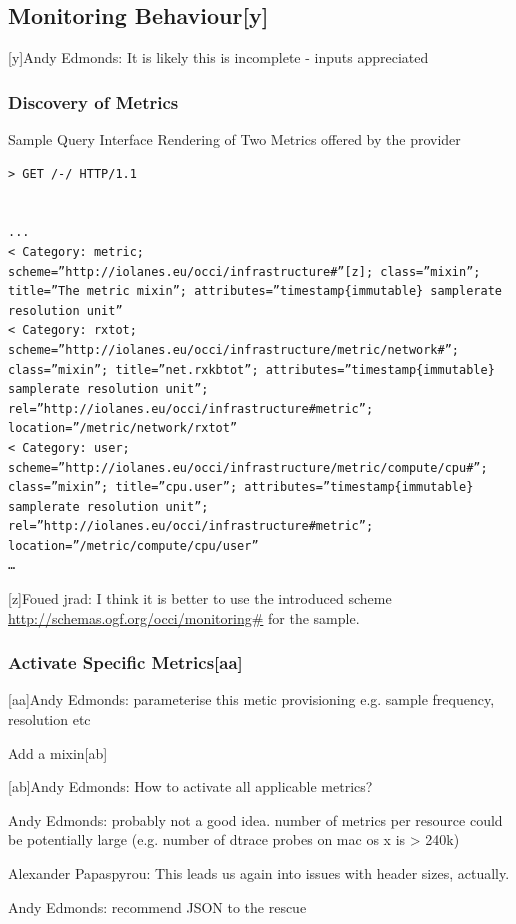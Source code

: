 \documentclass[12pt]{article}  %
\begin{document}
\subsection{Monitoring Behaviour[y]}

{
\color{blue}
[y]Andy Edmonds:
It is likely this is incomplete - inputs appreciated
}

\subsubsection{Discovery of Metrics}

Sample Query Interface Rendering of Two Metrics offered by the provider

\begin{verbatim}
> GET /-/ HTTP/1.1        


...
< Category: metric; scheme=”http://iolanes.eu/occi/infrastructure#”[z]; class=”mixin”; title=”The metric mixin”; attributes=”timestamp{immutable} samplerate resolution unit”
< Category: rxtot; scheme=”http://iolanes.eu/occi/infrastructure/metric/network#”; class=”mixin”; title=”net.rxkbtot”; attributes=”timestamp{immutable} samplerate resolution unit”; rel=”http://iolanes.eu/occi/infrastructure#metric”; location=”/metric/network/rxtot”
< Category: user; scheme=”http://iolanes.eu/occi/infrastructure/metric/compute/cpu#”; class=”mixin”; title=”cpu.user”; attributes=”timestamp{immutable} samplerate resolution unit”; rel=”http://iolanes.eu/occi/infrastructure#metric”; location=”/metric/compute/cpu/user”
…
\end{verbatim}

{
\color{blue}
[z]Foued jrad:
I think it is better to use the introduced scheme \url{http://schemas.ogf.org/occi/monitoring#} for the sample.
}

\subsubsection{Activate Specific Metrics[aa]}

{
\color{blue}
[aa]Andy Edmonds:
parameterise this metic provisioning e.g. sample frequency, resolution etc
}

Add a mixin[ab]

{
\color{blue}
[ab]Andy Edmonds:
How to activate all applicable metrics?

Andy Edmonds:
probably not a good idea. number of metrics per resource could be potentially large (e.g. number of dtrace probes on mac os x is > 240k)

Alexander Papaspyrou:
This leads us again into issues with header sizes, actually.

Andy Edmonds:
recommend JSON to the rescue
}
\end{document}
